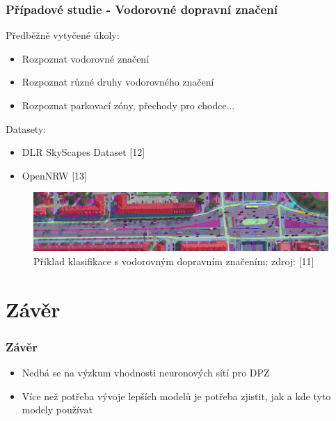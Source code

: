 \documentclass[10pt, t]{beamer}
\begin{document}
\begin{frame}

\frametitle{Případové studie - Vodorovné dopravní značení}

Předběžně vytyčené úkoly:

\begin{itemize}
	\item Rozpoznat vodorovné značení
	\item Rozpoznat různé druhy vodorovného značení
	\item Rozpoznat parkovací zóny, přechody pro chodce...
\end{itemize}

Datasety:

\begin{itemize}
	\item DLR SkyScapes Dataset [12]
	\item OpenNRW [13]
\end{itemize}

\begin{figure}[h]
   \centering
	\includegraphics[width=\linewidth]{../pictures/horizontal-traffic-signs.jpg}
	\caption[]{Příklad klasifikace s vodorovným dopravním značením; zdroj: [11]}
\end{figure}

\end{frame}


\section{Závěr}


\begin{frame}

\frametitle{Závěr}

\begin{itemize}
	\item Nedbá se na výzkum vhodnosti neuronových sítí pro DPZ
	\item Více než potřeba vývoje lepších modelů je potřeba zjistit, jak a kde tyto modely používat
\end{itemize}

\end{frame}
\end{document}
